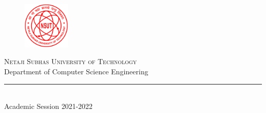 \thispagestyle{empty} %

\noindent %
\begin{figure}
	\centering
	\includegraphics[width=0.20\textwidth]{img/NSUT.png}
\end{figure}

\begin{minipage}[b]{0.9\textwidth}
	\centering
	{\Large {\textsc{Netaji Subhas University of Technology}}}\\
	\vspace{0.4 em}
	{\large {Department of Computer Science Engineering}}
	\vspace{0.6 em}
\end{minipage}%

\vspace{0.5 em}

\begin{center}

	{\large {\textsc{\esame}}} %
	\vspace{8 em}

	{\Huge {\titolo}} %
	\vspace{10 em}


	\vspace{6 em}
	\vfill

	\rule{380pt}{.4pt}
	\vspace{1.2 em}
	\large{\\Academic Session 2021-2022} %

\end{center}

\pagebreak